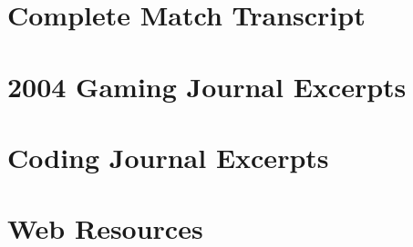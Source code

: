\begin{appendices}
  \chapter{Complete Match Transcript}
  \chapter{2004 Gaming Journal Excerpts}
  \chapter{Coding Journal Excerpts}
  \chapter{Web Resources}
\end{appendices}
\clearpage